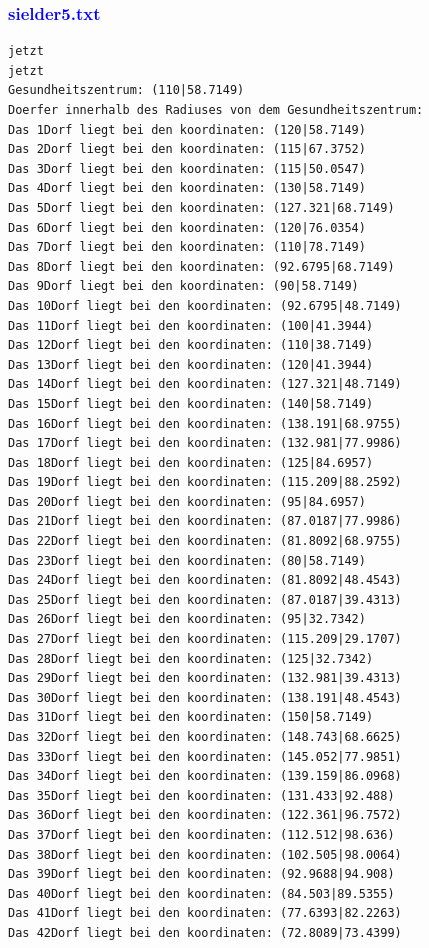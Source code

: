 \documentclass{article}
\begin{document}
\subsubsection{\textcolor{blue}{sielder5.txt}}
\begin{verbatim}
jetzt
jetzt
Gesundheitszentrum: (110|58.7149)
Doerfer innerhalb des Radiuses von dem Gesundheitszentrum: 
Das 1Dorf liegt bei den koordinaten: (120|58.7149)
Das 2Dorf liegt bei den koordinaten: (115|67.3752)
Das 3Dorf liegt bei den koordinaten: (115|50.0547)
Das 4Dorf liegt bei den koordinaten: (130|58.7149)
Das 5Dorf liegt bei den koordinaten: (127.321|68.7149)
Das 6Dorf liegt bei den koordinaten: (120|76.0354)
Das 7Dorf liegt bei den koordinaten: (110|78.7149)
Das 8Dorf liegt bei den koordinaten: (92.6795|68.7149)
Das 9Dorf liegt bei den koordinaten: (90|58.7149)
Das 10Dorf liegt bei den koordinaten: (92.6795|48.7149)
Das 11Dorf liegt bei den koordinaten: (100|41.3944)
Das 12Dorf liegt bei den koordinaten: (110|38.7149)
Das 13Dorf liegt bei den koordinaten: (120|41.3944)
Das 14Dorf liegt bei den koordinaten: (127.321|48.7149)
Das 15Dorf liegt bei den koordinaten: (140|58.7149)
Das 16Dorf liegt bei den koordinaten: (138.191|68.9755)
Das 17Dorf liegt bei den koordinaten: (132.981|77.9986)
Das 18Dorf liegt bei den koordinaten: (125|84.6957)
Das 19Dorf liegt bei den koordinaten: (115.209|88.2592)
Das 20Dorf liegt bei den koordinaten: (95|84.6957)
Das 21Dorf liegt bei den koordinaten: (87.0187|77.9986)
Das 22Dorf liegt bei den koordinaten: (81.8092|68.9755)
Das 23Dorf liegt bei den koordinaten: (80|58.7149)
Das 24Dorf liegt bei den koordinaten: (81.8092|48.4543)
Das 25Dorf liegt bei den koordinaten: (87.0187|39.4313)
Das 26Dorf liegt bei den koordinaten: (95|32.7342)
Das 27Dorf liegt bei den koordinaten: (115.209|29.1707)
Das 28Dorf liegt bei den koordinaten: (125|32.7342)
Das 29Dorf liegt bei den koordinaten: (132.981|39.4313)
Das 30Dorf liegt bei den koordinaten: (138.191|48.4543)
Das 31Dorf liegt bei den koordinaten: (150|58.7149)
Das 32Dorf liegt bei den koordinaten: (148.743|68.6625)
Das 33Dorf liegt bei den koordinaten: (145.052|77.9851)
Das 34Dorf liegt bei den koordinaten: (139.159|86.0968)
Das 35Dorf liegt bei den koordinaten: (131.433|92.488)
Das 36Dorf liegt bei den koordinaten: (122.361|96.7572)
Das 37Dorf liegt bei den koordinaten: (112.512|98.636)
Das 38Dorf liegt bei den koordinaten: (102.505|98.0064)
Das 39Dorf liegt bei den koordinaten: (92.9688|94.908)
Das 40Dorf liegt bei den koordinaten: (84.503|89.5355)
Das 41Dorf liegt bei den koordinaten: (77.6393|82.2263)
Das 42Dorf liegt bei den koordinaten: (72.8089|73.4399)

\end{verbatim}
\end{document}
